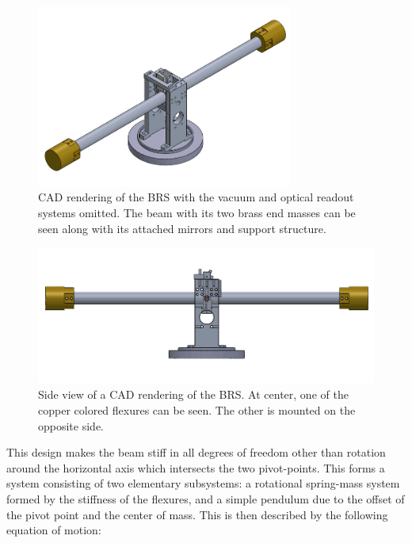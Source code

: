 \documentclass [12pt, proquest]{uwthesis}[2019]
\begin{document}
\begin{figure}
\begin{center} \includegraphics[width=0.75\textwidth]{BRSIso.png}
\caption[CAD rendering of the BRS]{CAD rendering of the BRS with the vacuum and optical readout systems omitted. The beam with its two brass end masses can be seen along with its attached mirrors and support structure. }
\end{center}
\end{figure} 
\begin{figure}
\begin{center} 
\includegraphics[width=\textwidth]{BRSFront.png}
\end{center}
\caption[Side view of a CAD rendering of the BRS]{Side view of a CAD rendering of the BRS. At center, one of the copper colored flexures can be seen. The other is mounted on the opposite side.}
\label{BRSImage}
\end{figure}


This design makes the beam stiff in all degrees of freedom other than rotation around the horizontal axis which intersects the two pivot-points. This forms a system consisting of two elementary subsystems: a rotational spring-mass system formed by the stiffness of the flexures, and a simple pendulum due to the offset of the pivot point and the center of mass. This is then described by the following equation of motion: \cite{venk2014}
\end{document}
